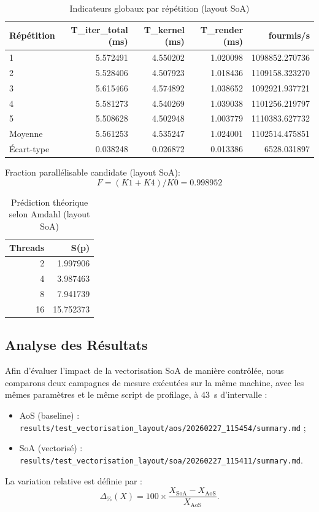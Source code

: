 \begin{table}[H]
\centering
\small
\caption{Indicateurs globaux par répétition (layout SoA)}
\label{tab:vec-soa-global}
\begin{tabular}{@{}lrrrr@{}}
\toprule
\textbf{Répétition} & \textbf{T\_iter\_total (ms)} & \textbf{T\_kernel (ms)} & \textbf{T\_render (ms)} & \textbf{fourmis/s} \\
\midrule
1 & 5.572491 & 4.550202 & 1.020098 & 1098852.270736 \\
2 & 5.528406 & 4.507923 & 1.018436 & 1109158.323270 \\
3 & 5.615466 & 4.574892 & 1.038652 & 1092921.937721 \\
4 & 5.581273 & 4.540269 & 1.039038 & 1101256.219797 \\
5 & 5.508628 & 4.502948 & 1.003779 & 1110383.627732 \\
Moyenne & 5.561253 & 4.535247 & 1.024001 & 1102514.475851 \\
Écart-type & 0.038248 & 0.026872 & 0.013386 & 6528.031897 \\
\bottomrule
\end{tabular}
\end{table}

\noindent
Fraction parallélisable candidate (layout SoA):
\[
F = (K1 + K4) / K0 = 0.998952
\]

\begin{table}[H]
\centering
\caption{Prédiction théorique selon Amdahl (layout SoA)}
\label{tab:vec-soa-amdahl}
\begin{tabular}{@{}rr@{}}
\toprule
\textbf{Threads} & \textbf{S(p)} \\
\midrule
2 & 1.997906 \\
4 & 3.987463 \\
8 & 7.941739 \\
16 & 15.752373 \\
\bottomrule
\end{tabular}
\end{table}

\subsection{Analyse des Résultats}

\noindent
Afin d'évaluer l'impact de la vectorisation SoA de manière contrôlée, nous comparons deux campagnes de mesure
exécutées sur la même machine, avec les mêmes paramètres et le même script de profilage, à 43~s d'intervalle :
\begin{itemize}[leftmargin=*]
    \item AoS (baseline) : \texttt{results/test\_vectorisation\_layout/aos/20260227\_115454/summary.md} ;
    \item SoA (vectorisé) : \texttt{results/test\_vectorisation\_layout/soa/20260227\_115411/summary.md}.
\end{itemize}
La variation relative est définie par :
\[
\Delta_{\%}(X) = 100 \times \frac{X_{\mathrm{SoA}} - X_{\mathrm{AoS}}}{X_{\mathrm{AoS}}}.
\]

